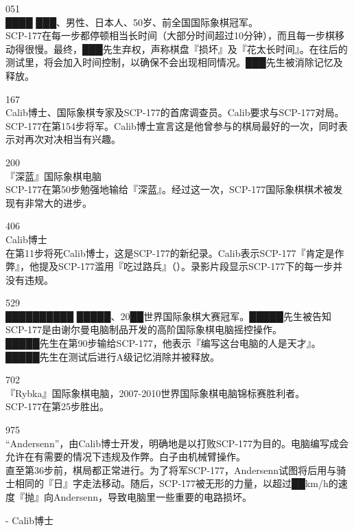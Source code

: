 051\\
████ ███、男性、日本人、50岁、前全国国际象棋冠军。\\
SCP-177在每一步都停顿相当长时间（大部分时间超过10分钟），而且每一步棋移动得很慢。最终，███先生弃权，声称棋盘『损坏』及『花太长时间』。在往后的测试里，将会加入时间控制，以确保不会出现相同情况。███先生被消除记忆及释放。

167\\
Calib博士、国际象棋专家及SCP-177的首席调查员。Calib要求与SCP-177对局。\\
SCP-177在第154步将军。Calib博士宣言这是他曾参与的棋局最好的一次，同时表示对再次对决相当有兴趣。

200\\
『深蓝』国际象棋电脑\\
SCP-177在第50步勉强地输给『深蓝』。经过这一次，SCP-177国际象棋棋术被发现有非常大的进步。

406\\
Calib博士\\
在第11步将死Calib博士，这是SCP-177的新纪录。Calib表示SCP-177『肯定是作弊』，他提及SCP-177滥用『吃过路兵』（）。录影片段显示SCP-177下的每一步并没有违规。

529\\
██████████ █████、20██世界国际象棋大赛冠军。█████先生被告知SCP-177是由谢尔曼电脑制品开发的高阶国际象棋电脑摇控操作。\\
█████先生在第90步输给SCP-177，他表示『编写这台电脑的人是天才』。█████先生在测试后进行A级记忆消除并被释放。

702\\
『Rybka』国际象棋电脑，2007-2010世界国际象棋电脑锦标赛胜利者。\\
SCP-177在第25步胜出。

975\\
“Andersenn”，由Calib博士开发，明确地是以打败SCP-177为目的。电脑编写成会允许在有需要的情况下违规及作弊。白子由机械臂操作。\\
直至第36步前，棋局都正常进行。为了将军SCP-177，Andersenn试图将后用与骑士相同的『日』字走法移动。随后，SCP-177被无形的力量，以超过██km\slash h的速度『抛』向Andersenn，导致电脑里一些重要的电路损坏。

 - Calib博士
